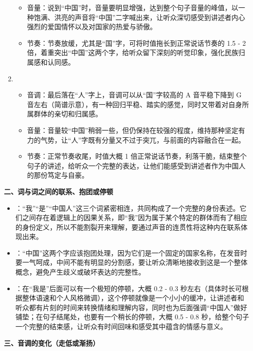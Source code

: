 \begin{enumerate}
\begin{itemize}
            \item 音量：说到“中国”时，音量要明显增强，达到整个句子音量的峰值，以一种饱满、洪亮的声音将“中国”二字喊出来，让听众深切感受到讲述者内心强烈的爱国情怀以及对国家的热爱与骄傲。
            \item 节奏：节奏放缓，尤其是“国”字，可将时值拖长到正常说话节奏的 1.5 - 2 倍，着重突出“中国”这两个字，给听众留下深刻的听觉印象，强化民族归属感和认同感。
        \end{itemize}
    \item {}
        \begin{itemize}
            \item 音调：最后落在“人”字上，音调可以从“国”字较高的 A 音平稳下降到 G 音左右（简谱示意），有一种回归平稳、踏实的感觉，同时又带着对自身所属群体的亲切和归属感。
            \item 音量：音量较“中国”稍弱一些，但仍保持在较强的程度，维持那种坚定有力的气势，让“人”字既有分量又不过于突兀，与前面的内容融合在一起。
            \item 节奏：正常节奏收尾，时值大概 1 倍正常说话节奏，利落干脆，结束整个句子的讲述，给听众一个完整的表达，让他们能感受到讲述者作为中国人的那份笃定与自豪。
        \end{itemize}
\end{enumerate}
\noindent\textbf{二、词与词之间的联系、抱团或停顿}
\begin{itemize}
    \item {}：“我”“是”“中国人”这三个词紧密相连，共同构成了一个完整的身份表述。它们之间存在着逻辑上的因果关系，即“我”因为属于某个特定的群体而有了相应的身份定义，所以不能割裂开来理解，要通过声音的连贯性将这种内在联系体现出来。
    \item {}：“中国”这两个字应该抱团处理，因为它们是一个固定的国家名称，在发音时要一气呵成，中间不能有明显的分割感，要让听众清晰地接收到这是一个整体概念，避免产生歧义或破坏表达的完整性。
    \item {}：在“我是”后面可以有一个极短的停顿，大概 0.2 - 0.3 秒左右（具体时长可根据整体语速和个人风格微调），这个停顿就像是一个小小的缓冲，让讲述者和听众都有片刻的时间来转换情绪和理解内容，同时也为后面强调“中国人”做好铺垫；在句子结尾处，也要有一个稍长的停顿，大概 0.5 - 0.8 秒，给整个句子一个完整的结束感，让听众有时间回味和感受其中蕴含的情感与意义。
\end{itemize}
\noindent\textbf{三、音调的变化（走低或渐扬）}



